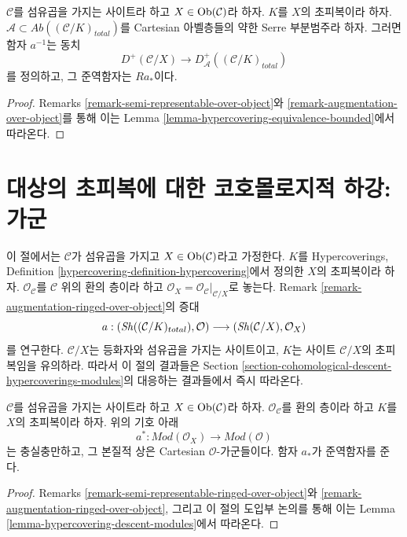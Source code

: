 \begin{lemma}
\label{lemma-hypercovering-X-equivalence-bounded}
$\mathcal{C}$를 섬유곱을 가지는 사이트라 하고
$X \in \mathop{\mathrm{Ob}}\nolimits(\mathcal{C})$라 하자. $K$를 $X$의 초피복이라 하자.
$\mathcal{A} \subset \textit{Ab}((\mathcal{C}/K)_{total})$를
Cartesian 아벨층들의 약한 Serre 부분범주라 하자. 그러면 함자
$a^{-1}$는 동치
$$
D^+(\mathcal{C}/X) \longrightarrow D_\mathcal{A}^+((\mathcal{C}/K)_{total})
$$
를 정의하고, 그 준역함자는 $Ra_*$이다.
\end{lemma}

\begin{proof}
Remarks \ref{remark-semi-representable-over-object}와
\ref{remark-augmentation-over-object}를 통해 이는 Lemma
\ref{lemma-hypercovering-equivalence-bounded}에서 따라온다.
\end{proof}

\section{대상의 초피복에 대한 코호몰로지적 하강: 가군}
\label{section-cohomological-descent-hypercoverings-X-modules}

\noindent
이 절에서는 $\mathcal{C}$가 섬유곱을 가지고
$X \in \mathop{\mathrm{Ob}}\nolimits(\mathcal{C})$라고 가정한다. $K$를 Hypercoverings,
Definition \ref{hypercovering-definition-hypercovering}에서 정의한
$X$의 초피복이라 하자. $\mathcal{O}_\mathcal{C}$를 $\mathcal{C}$ 위의
환의 층이라 하고
$\mathcal{O}_X = \mathcal{O}_\mathcal{C}|_{\mathcal{C}/X}$로 놓는다.
Remark \ref{remark-augmentation-ringed-over-object}의 증대
$$
a :
(\mathop{\mathit{Sh}}\nolimits((\mathcal{C}/K)_{total}), \mathcal{O})
\longrightarrow
(\mathop{\mathit{Sh}}\nolimits(\mathcal{C}/X), \mathcal{O}_X)
$$
를 연구한다. $\mathcal{C}/X$는 등화자와 섬유곱을 가지는 사이트이고,
$K$는 사이트 $\mathcal{C}/X$의 초피복임을 유의하라. 따라서 이 절의
결과들은 Section
\ref{section-cohomological-descent-hypercoverings-modules}의 대응하는
결과들에서 즉시 따라온다.

\begin{lemma}
\label{lemma-hypercovering-X-descent-modules}
$\mathcal{C}$를 섬유곱을 가지는 사이트라 하고
$X \in \mathop{\mathrm{Ob}}\nolimits(\mathcal{C})$라 하자. $\mathcal{O}_\mathcal{C}$를 환의
층이라 하고 $K$를 $X$의 초피복이라 하자. 위의 기호 아래
$$
a^* : \textit{Mod}(\mathcal{O}_X) \to \textit{Mod}(\mathcal{O})
$$
는 충실충만하고, 그 본질적 상은 Cartesian $\mathcal{O}$-가군들이다.
함자 $a_*$가 준역함자를 준다.
\end{lemma}

\begin{proof}
Remarks \ref{remark-semi-representable-ringed-over-object}와
\ref{remark-augmentation-ringed-over-object}, 그리고 이 절의 도입부
논의를 통해 이는 Lemma
\ref{lemma-hypercovering-descent-modules}에서 따라온다.
\end{proof}

